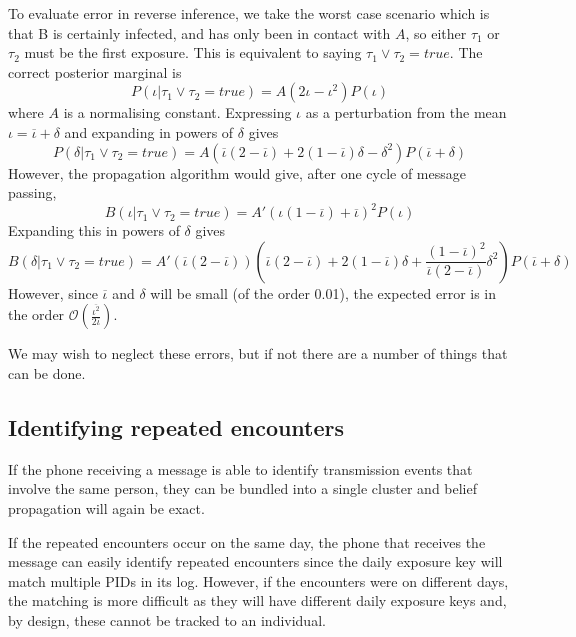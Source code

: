\documentclass{article}
\begin{document}
To evaluate error in reverse inference, we take the worst case scenario which is that B is certainly infected, and has only been in contact with $A$, so either $\tau_1$ or $\tau_2$ must be the first exposure. This is equivalent to saying $\tau_1 \vee \tau_2 = true$. The correct posterior marginal is
\[
P(\iota | \tau_1 \vee \tau_2 = true) = A\left(2\iota - \iota^2\right)P(\iota)
\]
where $A$ is a normalising constant. Expressing $\iota$ as a perturbation from the mean $\iota = \overline{\iota} + \delta$ and expanding in powers of $\delta$ gives
\[
P(\delta | \tau_1 \vee \tau_2 = true) = A\left(\overline{\iota}(2 - \overline{\iota}) + 2(1-\overline{\iota})\delta - \delta^2\right)P(\overline{\iota}+\delta)
\]
 However, the propagation algorithm would give, after one cycle of message passing, 
\[
B(\iota | \tau_1 \vee \tau_2 = true) = A' (\iota(1 - \overline\iota) + \overline{\iota})^2P(\iota)
\]
Expanding this in powers of $\delta$ gives
\[
B(\delta | \tau_1 \vee \tau_2 = true) = A'(\overline{\iota}(2 - \overline{\iota})) \left(
\overline{\iota}(2 - \overline{\iota}) +
2(1-\overline{\iota})\delta +
\frac{(1-\overline{\iota})^2}{\overline{\iota}(2 - \overline{\iota})}\delta^2
\right)P(\overline{\iota}+\delta)
\]
However, since $\overline{\iota}$ and $\delta$ will be small (of the order 0.01\cite{luo2020modes}), the expected error is in the order $\mathcal{O}(\frac{\overline{\iota^2}}{2\overline{\iota}})$.

We may wish to neglect these errors, but if not there are a number of things that can be done.


\subsection{Identifying repeated encounters}

If the phone receiving a message is able to identify transmission events that involve the same person, they can be bundled into a single cluster and belief propagation will again be exact.

If the repeated encounters occur on the same day, the phone that receives the message can easily identify repeated encounters since the daily exposure key will match multiple PIDs in its log. However, if the encounters were on different days, the matching is more difficult as they will have different daily exposure keys and, by design, these cannot be tracked to an individual.
\end{document}
